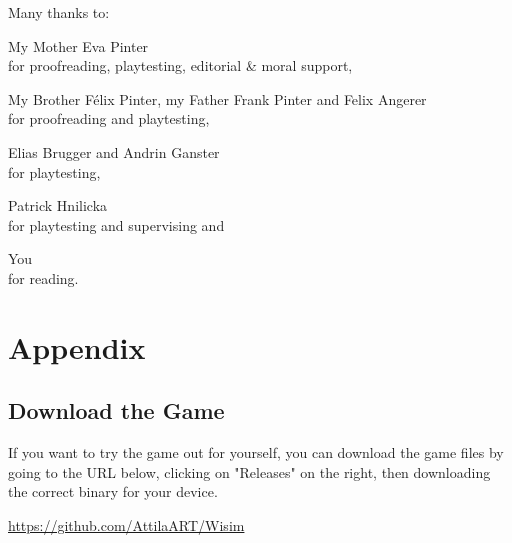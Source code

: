 \begin{center}

	Many thanks to:

	\vspace*{0.25cm}

	{\huge \ClashGroteskSemibold \color{sectionColor} My Mother Eva Pinter} \\
	for proofreading, playtesting, editorial \& moral support,

	\vspace*{0.25cm}

	{\huge \ClashGroteskSemibold \color{sectionColor} My Brother Félix Pinter, my Father Frank Pinter and Felix Angerer} \\
	for proofreading and playtesting,

	\vspace*{0.25cm}

	{\huge \ClashGroteskSemibold \color{sectionColor} Elias Brugger and Andrin Ganster} \\
	for playtesting,

	\vspace*{0.25cm}

	{\huge \ClashGroteskSemibold \color{sectionColor} Patrick Hnilicka} \\
	for playtesting and supervising and

	\vspace*{0.25cm}

	{\huge \ClashGroteskSemibold \color{sectionColor} You} \\
	for reading.

\end{center}

\vspace*{\fill}

\clearpage
\section{Appendix}

\subsection{Download the Game}

If you want to try the game out for yourself, you can download the game files by going to the URL below, clicking on
"Releases" on the right, then downloading the correct binary for your device.

\href{https://github.com/AttilaART/Wisim}{https://github.com/AttilaART/Wisim}

